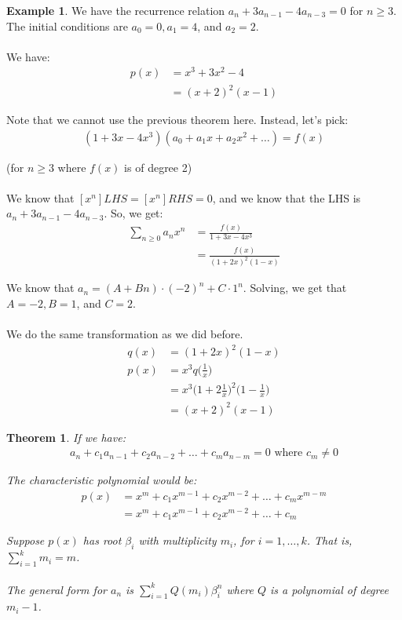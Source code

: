 \documentclass[]{article}
\newtheorem*{theorem}{Theorem}
\theoremstyle{definition}
\newtheorem{ex}{Example}[section]
\newcommand{\lecture}[1]{\marginpar{{\footnotesize $\leftarrow$ \underline{#1}}}}
\begin{document}
		\begin{ex}
			We have the recurrence relation $a_n + 3a_{n - 1} - 4a_{n - 3} = 0$ for $n \ge 3$. The initial conditions are $a_0 = 0, a_1 = 4$, and $a_2 = 2$.
			\\ \\
			We have:
			\begin{align*}
				p(x) &= x^3 + 3x^2 - 4 \\
				&= (x + 2)^2 (x - 1)
			\end{align*}

			Note that we cannot use the previous theorem here. Instead, let's pick:
			\begin{align*}
				(1 + 3x - 4x^3)(a_0 + a_1x + a_2x^2 + \ldots) = f(x)
			\end{align*}

			(for $n \ge 3$ where $f(x)$ is of degree 2)
			\\ \\
			We know that $[x^n]LHS = [x^n]RHS = 0$, and we know that the LHS is $a_n + 3a_{n - 1} - 4a_{n - 3}$. So, we get:
			\begin{align*}
				\sum_{n \ge 0} a_n x^n &= \frac{f(x)}{1 + 3x - 4x^3} \\
				&= \frac{f(x)}{(1 + 2x)^2 (1 - x)}
			\end{align*}

			We know that $a_n = (A + Bn) \cdot (-2)^n + C \cdot 1^n$. Solving, we get that $A = -2, B = 1$, and $C = 2$. \lecture{February 13, 2013}
			\\ \\
			We do the same transformation as we did before.
			\begin{align*}
				q(x) &= (1 + 2x)^2 (1 - x) \\
				p(x) &= x^3 q\bigg(\frac{1}{x}\bigg) \\
				&= x^3\bigg( 1 + 2\frac{1}{x} \bigg)^2 \bigg(1 - \frac{1}{x} \bigg) \\
				&= (x + 2)^2 (x - 1)
			\end{align*}
		\end{ex}

		\begin{theorem}
			If we have:
			\begin{align*}
				a_n + c_1a_{n - 1} +c_2a_{n - 2} + \ldots + c_ma_{n - m} = 0 \text{ where } c_m \ne 0
			\end{align*}

			The characteristic polynomial would be:
			\begin{align*}
				p(x) &= x^m + c_1x^{m - 1} + c_2x^{m - 2} + \ldots + c_mx^{m - m} \\
				&= x^m + c_1x^{m - 1} + c_2x^{m - 2} + \ldots + c_m
			\end{align*}

			Suppose $p(x)$ has root $\beta_i$ with multiplicity $m_i$, for $i = 1, \ldots, k$. That is, $\sum_{i = 1}^{k} m_i = m$.
			\\ \\
			The general form for $a_n$ is $\displaystyle \sum_{i = 1}^{k} Q(m_i) \beta_i^n$ where $Q$ is a polynomial of degree $m_i - 1$.
		\end{theorem}
\end{document}
